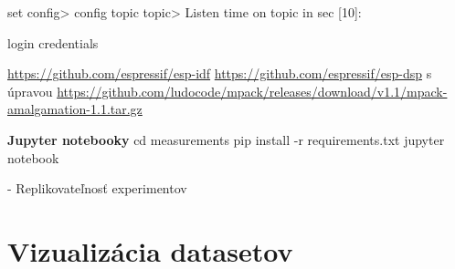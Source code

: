 	set
		config>
	config
	topic
		topic>
		Listen time on topic in sec [10]:

	login
	credentials

\url{https://github.com/espressif/esp-idf}
\url{https://github.com/espressif/esp-dsp} s úpravou
\url{https://github.com/ludocode/mpack/releases/download/v1.1/mpack-amalgamation-1.1.tar.gz}

\textbf{Jupyter notebooky}
cd measurements
pip install -r requirements.txt
jupyter notebook

- Replikovateľnosť experimentov


\thispagestyle{empty}

\chapter{Vizualizácia datasetov}
\renewcommand*{\thepage}{D-\arabic{page}}

